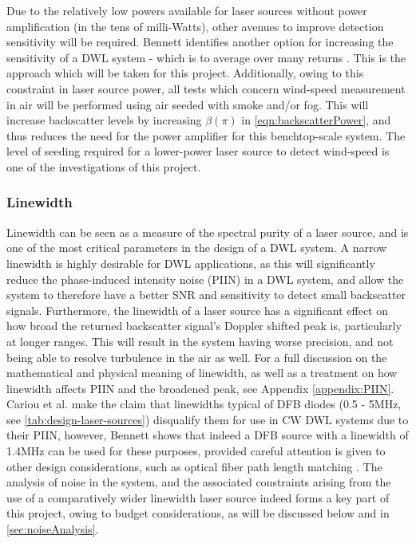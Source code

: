      Due to the relatively low powers available for laser sources without power amplification (in the tens of milli-Watts), other avenues to improve detection sensitivity will be required. Bennett identifies another option for increasing the sensitivity of a DWL system - which is to average over many returns \cite{bennett_doppler_2003}. This is the approach which will be taken for this project. Additionally, owing to this constraint in laser source power, all tests which concern wind-speed measurement in air will be performed using air seeded with smoke and/or fog. This will increase backscatter levels by increasing $\beta(\pi)$ in \autoref{eqn:backscatterPower}, and thus reduces the need for the power amplifier for this benchtop-scale system. The level of seeding required for a lower-power laser source to detect wind-speed is one of the investigations of this project.

    \subsubsection{Linewidth}
    \label{sec:lit-linewidth}
    Linewidth can be seen as a measure of the spectral purity of a laser source, and is one of the most critical parameters in the design of a DWL system. A narrow linewidth is highly desirable for DWL applications, as this will significantly reduce the phase-induced intensity noise (PIIN) in a DWL system, and allow the system to therefore have a better SNR and sensitivity to detect small backscatter signals. Furthermore, the linewidth of a laser source has a significant effect on how broad the returned backscatter signal's Doppler shifted peak is, particularly at longer ranges. This will result in the system having worse precision, and not being able to resolve turbulence in the air as well. For a full discussion on the mathematical and physical meaning of linewidth, as well as a treatment on how linewidth affects PIIN and the broadened peak, see Appendix \ref{appendix:PIIN}. Cariou et al. make the claim that linewidths typical of DFB diodes (0.5 - 5MHz, see \autoref{tab:design-laser-sources}) disqualify them for use in CW DWL systems due to their PIIN, however, Bennett shows that indeed a DFB source with a linewidth of 1.4MHz can be used for these purposes, provided careful attention is given to other design considerations, such as optical fiber path length matching \cite{bennett_doppler_2003}. The analysis of noise in the system, and the associated constraints arising from the use of a comparatively wider linewidth laser source indeed forms a key part of this project, owing to budget considerations, as will be discussed below and in \autoref{sec:noiseAnalysis}.
    
